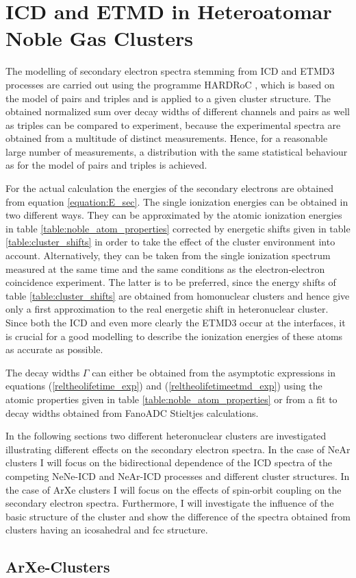 \chapter{ICD and ETMD in Heteroatomar Noble Gas Clusters}
\label{chapter_NeArclusters}

The modelling of secondary electron spectra stemming from \ac{ICD}
and \ac{ETMD}3 processes are carried out using the programme
HARDRoC \cite{HARDRoC}, which is based on the model of pairs and
triples and is applied to a given cluster structure. The obtained
normalized sum over decay widths of different channels
and pairs as well as triples can be compared to experiment, because the
experimental spectra are obtained from a multitude of distinct measurements.
Hence, for a reasonable large number of measurements, a distribution with the
same statistical behaviour as for the model of pairs and triples is achieved.

For the actual calculation the energies of the secondary electrons are obtained
from equation \ref{equation:E_sec}. The single ionization energies
can be obtained in two different ways. They can be
approximated by the atomic ionization energies in table
\ref{table:noble_atom_properties} corrected by energetic shifts
given in table \ref{table:cluster_shifts} in order to take
the effect of the cluster environment into account. 
Alternatively, they can be taken from the single ionization spectrum
measured at the same time and the same conditions as the electron-electron
coincidence experiment. The latter is to be preferred, since the energy shifts
of table \ref{table:cluster_shifts} are obtained from homonuclear clusters and
hence give only a first approximation to the real energetic shift in
heteronuclear cluster. Since both the \ac{ICD} and even more clearly the
\ac{ETMD}3 occur at the interfaces, it is crucial for a good modelling to
describe the ionization energies of these atoms as accurate as possible.

The decay widths $\Gamma$ can either be obtained from the asymptotic expressions
in equations (\ref{reltheolifetime_exp}) and (\ref{reltheolifetimeetmd_exp})
using the atomic properties given in table \ref{table:noble_atom_properties}
or from a fit to decay widths obtained from FanoADC Stieltjes calculations.

In the following sections two different heteronuclear clusters are investigated
illustrating different effects on the secondary electron spectra.
In the case of NeAr clusters I will focus on the bidirectional dependence of
the ICD spectra of the competing NeNe-ICD and NeAr-ICD processes and
different cluster structures. 
In the case of ArXe clusters I will focus on the effects of spin-orbit coupling
on the secondary electron spectra. Furthermore, I will investigate the influence
of the basic structure of the cluster and show the difference of the spectra
obtained from clusters having an icosahedral
and \ac{fcc} structure.


\section{ArXe-Clusters}

\begin{figure}[h]
 \centering
 
 \caption{}
\end{figure}






